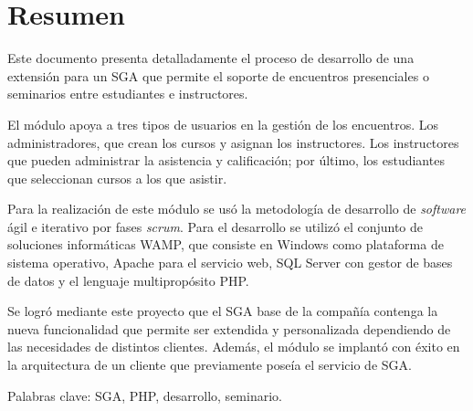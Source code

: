 \chapter*{Resumen}

Este documento presenta detalladamente el proceso de desarrollo de una extensión para un \gls{SGA} que permite el soporte de encuentros presenciales o seminarios entre estudiantes e instructores. 

El módulo apoya a tres tipos de usuarios en la gestión de los encuentros. Los administradores, que crean los cursos y asignan los instructores. Los instructores que pueden administrar la asistencia y calificación; por último, los estudiantes que seleccionan cursos a los que asistir.

Para la realización de este módulo se usó la metodología de desarrollo de \emph{software} ágil e iterativo por fases \emph{scrum}. Para el desarrollo se utilizó el conjunto de soluciones informáticas \gls{WAMP}, que consiste en Windows como plataforma de sistema operativo, Apache para el servicio web, \gls{SQL} Server con gestor de bases de datos y el lenguaje multipropósito \gls{PHP}.

Se logró mediante este proyecto que el SGA base de la compañía contenga la nueva funcionalidad que permite ser extendida y personalizada dependiendo de las necesidades de distintos clientes. Además, el módulo se implantó con éxito en la arquitectura de un cliente que previamente poseía el servicio de \gls{SGA}.

Palabras clave: \gls{SGA}, \gls{PHP}, desarrollo, seminario.




